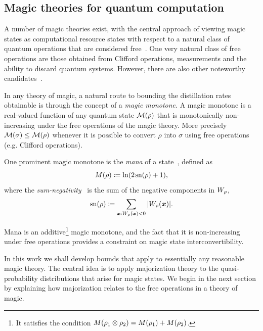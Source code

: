 \documentclass[pra,
aps,
twocolumn,
superscriptaddress,
groupedaddress,
nofootinbib,
reprint
]{revtex4-1}
\begin{document}
\subsection{Magic theories for quantum computation}
\label{sec:mono}

A number of magic theories exist, with the central approach of viewing magic states as computational resource states with respect to a natural class of quantum operations that are considered free~\cite{Gour_2019}. One very natural class of free operations are those obtained from Clifford operations, measurements and the ability to discard quantum systems. However, there are also other noteworthy candidates~\cite{cit:ahmadi, cit:seddon, Wang_2019}.

In any theory of magic, a natural route to bounding the distillation rates obtainable is through the concept of a \emph{magic monotone}. A magic monotone is a real-valued function of any quantum state ${\mathcal M}(\rho)$ that is monotonically non-increasing under the free operations of the magic theory. More precisely ${\mathcal M}(\sigma) \le {\mathcal M}(\rho)$ whenever it is possible to convert $\rho$ into $\sigma$ using free operations (e.g. Clifford operations).

One prominent magic monotone is the \emph{mana} of a state~\cite{cit:veitch2}, defined as
\begin{equation}
    {M(\rho)} \coloneqq \ln (2\hspace{1pt}{{\rm{sn}}(\rho)}+1),
\end{equation}
where the \emph{sum-negativity}~\cite{cit:veitch2} is the sum of the negative components in $\W{\rho}$,
\begin{equation}
    \sn{\rho} \coloneqq \sum\limits_{\bmx: \W[\bmx]{\rho} < 0} \abs{\W[\bmx]{\rho}}.
\end{equation}

Mana is an additive\footnote{It satisfies the condition ${M(\rho_1 \otimes \rho_2)} = {M(\rho_1)} + {M(\rho_2)}$.} magic monotone, and the fact that it is non-increasing under free operations provides a constraint on magic state interconvertibility.

In this work we shall develop bounds that apply to essentially any reasonable magic theory. The central idea is to apply majorization theory to the quasi-probability distributions that arise for magic states. We begin in the next section by explaining how majorization relates to the free operations in a theory of magic.


\end{document}
